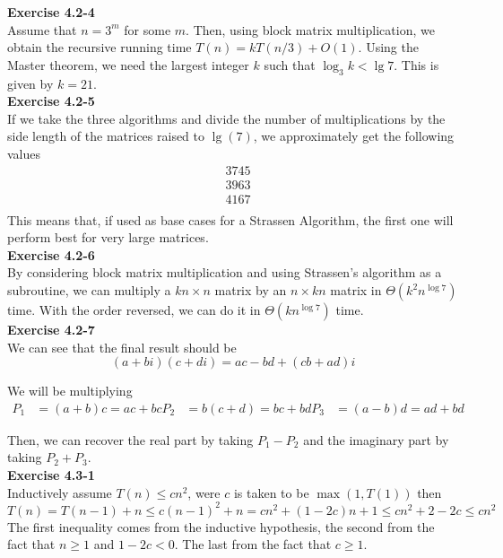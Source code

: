 \documentclass{article}
\begin{document}
\noindent\textbf{Exercise 4.2-4}\\

Assume that $n = 3^m$ for some $m$.  Then, using block matrix multiplication, we obtain the recursive running time $T(n) = kT(n/3) + O(1)$.  Using the Master theorem, we need the largest integer $k$ such that $\log_3 k < \lg 7$.  This is given by $k=21$.\\

\noindent\textbf{Exercise 4.2-5}\\

If we take the three algorithms and divide the number of multiplications by the side length of the matrices raised to $\lg(7)$, we approximately get the following values
\begin{align*}
&3745\\
&3963\\
&4167\\
\end{align*}
This means that, if used as base cases for a Strassen Algorithm, the first one will perform best for very large matrices.\\

\noindent\textbf{Exercise 4.2-6}\\

By considering block matrix multiplication and using Strassen's algorithm as a subroutine, we can multiply a $kn \times n$ matrix by an $n \times kn$ matrix in $\Theta(k^2n^{\log 7})$ time.  With the order reversed, we can do it in $\Theta(k n^{\log 7})$ time. \\

\noindent\textbf{Exercise 4.2-7}\\

We can see that the final result should be
\[
(a+bi)(c+di) = ac-bd +(cb+ad) i
\]

We will be multiplying 
\begin{align*}
P_1 &= (a+b)c = ac+bc
P_2 &= b(c+d) = bc+bd
P_3&= (a-b)d = ad+bd
\end{align*}

Then, we can recover the real part by taking $P_1 - P_2$ and the imaginary part by taking $P_2+P_3$.\\

\noindent\textbf{Exercise 4.3-1}\\

Inductively assume $T(n)\le c n^2$, were $c$ is taken to be $\max(1,T(1))$ then
\[
T(n) = T(n-1)+n \le c(n-1)^2 +n = c n^2 +(1-2c)n + 1 \le c n^2 +2-2c \le c n^2
\]
The first inequality comes from the inductive hypothesis, the second from the fact that $n\ge 1$ and $1-2c <0$. The last from the fact that $c\ge 1$.\\
\end{document}

